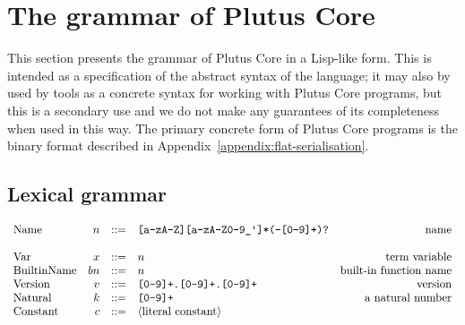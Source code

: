\section{The grammar of Plutus Core}
\label{sec:untyped-plc-grammar}
This section presents the grammar of Plutus Core in a Lisp-like form.  This is
intended as a specification of the abstract syntax of the language; it may also
by used by tools as a concrete syntax for working with Plutus Core programs, but
this is a secondary use and we do not make any guarantees of its completeness
when used in this way.  The primary concrete form of Plutus Core programs is the
binary format described in Appendix~\ref{appendix:flat-serialisation}.

\subsection{Lexical grammar}
\label{sec:untyped-plc}
\thispagestyle{plain}
\pagestyle{plain}

\begin{minipage}{\linewidth}
    \centering
    \[\begin{array}{lrclr}
        \textrm{Name}          & n      & ::= & \texttt{[a-zA-Z][a-zA-Z0-9\_\textquotesingle]*(-[0-9]+)?}   & \textrm{name}\\
        \\
        \textrm{Var}           & x      & ::= & n & \textrm{term variable}\\
        \textrm{BuiltinName}   & bn     & ::= & n & \textrm{built-in function name}\\
        \textrm{Version} & v & ::= & \texttt{[0-9]+.[0-9]+.[0-9]+}& \textrm{version}\\
        \textrm{Natural}  & k      & ::= & \texttt{[0-9]+} & \textrm{a natural number}\\
        \textrm{Constant} & c & ::= & \langle{\textrm{literal constant}}\rangle& \\
    \end{array}\]
    \label{fig:lexical-grammar-untyped}
\end{minipage}%
%
%
%
%
%
%
%




